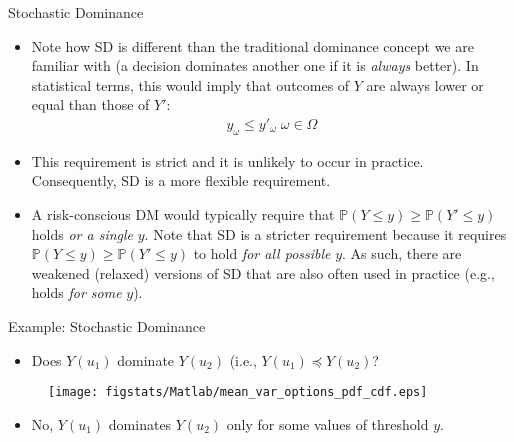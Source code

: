 \documentclass[9pt]{beamer}
\begin{document}
%
\begin{frame}{Stochastic Dominance}

\begin{itemize}

\item Note how SD is different than the traditional dominance concept we are familiar with (a decision dominates another one if it is {\em always} better). In statistical terms, this would imply that outcomes of $Y$ are always lower or equal than those of $Y'$:
\begin{align*}
y_{\omega}\leq y'_\omega\; \omega \in \Omega
\end{align*}
\item This requirement is strict and it is unlikely to occur in practice. Consequently, SD is a more flexible requirement. 
\item A risk-conscious DM would typically require that $\mathbb{P}(Y\leq y)\geq \mathbb{P}(Y'\leq y)$ holds {\em or a single} $y$. Note that SD is a stricter requirement because it requires $\mathbb{P}(Y\leq y)\geq \mathbb{P}(Y'\leq y)$ to hold {\em for all possible} $y$. As such, there are weakened (relaxed) versions of SD that are also often used in practice (e.g., holds {\em for some} $y$).  
\end{itemize}


\end{frame}

%
\begin{frame}{Example: Stochastic Dominance}

\begin{itemize}
\item Does $Y(u_1)$ dominate $Y(u_2)$ (i.e., $Y(u_1)\preceq Y(u_2)$? 
\end{itemize}
\begin{figure}[!htb]
    \centering
	\texttt{[image: figstats/Matlab/mean\_var\_options\_pdf\_cdf.eps]}
\end{figure}
\pause 
\begin{itemize}
\item No, $Y(u_1)$ dominates $Y(u_2)$ only for some values of threshold $y$.
\end{itemize}


\end{frame}
\end{document}
